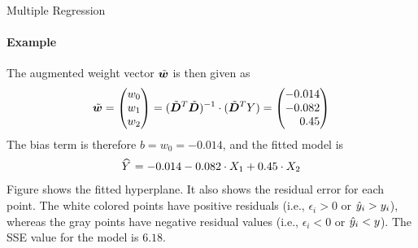 \begin{frame}{Multiple Regression}
\framesubtitle{Example}
The augmented weight vector $\tilde{{\boldsymbol w}}$ is then given as
\begin{align*}
    \abw = \matr{w_0\\w_1\\w_2} = (\abD^T\abD)^{-1} \cdot (\abD^T Y) = 
    \amatr{r}{-0.014\\ -0.082\\ 0.45}
\end{align*}
The bias term is therefore $b=w_0=-0.014$, and
the fitted model is 
\begin{align*}
    \mkern 1.5mu\widehat{\mkern-1.5muY}\mkern 1.5mu = -0.014 -0.082 \cdot X_1 + 0.45\cdot X_2
\end{align*}
Figure shows the fitted hyperplane. It 
also shows
the residual error for each point. The white colored points have
positive residuals (i.e., $\epsilon_i > 0$ or $\hat{y}_i > y_i$), whereas the gray points have negative residual
values (i.e., $\epsilon_i < 0$ or $\hat{y}_i < y$). The SSE value for the
model is $6.18$.
\end{frame}
%
